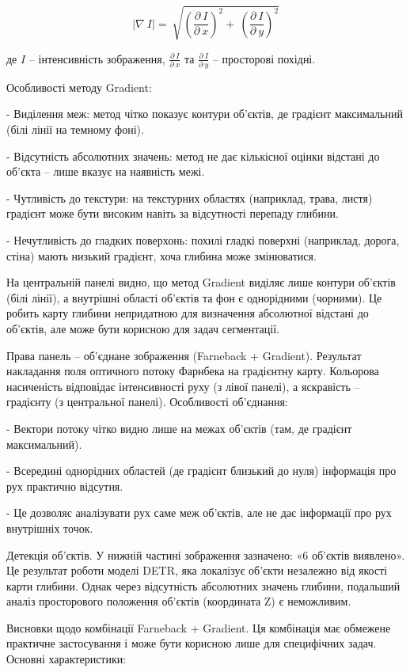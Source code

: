 \documentclass[
]{article}
\begin{document}
\[|\nabla\ I| = \ \sqrt{\left( \frac{\partial\ I}{\partial\ x} \right)^{2} + \ \left( \frac{\partial\ I}{\partial\ y} \right)^{2}}\]

де \(I\) -- інтенсивність зображення, \(\frac{\partial\ I}{\partial\ x}\) та \(\frac{\partial\ I}{\partial\ y}\) -- просторові похідні.

Особливості методу Gradient:

- Виділення меж: метод чітко показує контури об'єктів, де градієнт максимальний (білі лінії на темному фоні).

- Відсутність абсолютних значень: метод не дає кількісної оцінки відстані до об'єкта -- лише вказує на наявність межі.

- Чутливість до текстури: на текстурних областях (наприклад, трава, листя) градієнт може бути високим навіть за відсутності перепаду глибини.

- Нечутливість до гладких поверхонь: похилі гладкі поверхні (наприклад, дорога, стіна) мають низький градієнт, хоча глибина може змінюватися.

На центральній панелі видно, що метод Gradient виділяє лише контури об'єктів (білі лінії), а внутрішні області об'єктів та фон є однорідними (чорними). Це робить карту глибини непридатною для визначення абсолютної відстані до об'єктів, але може бути корисною для задач сегментації.

Права панель -- об'єднане зображення (Farneback + Gradient). Результат накладання поля оптичного потоку Фарнбека на градієнтну карту. Кольорова насиченість відповідає інтенсивності руху (з лівої панелі), а яскравість -- градієнту (з центральної панелі). Особливості об'єднання:

- Вектори потоку чітко видно лише на межах об'єктів (там, де градієнт максимальний).

- Всередині однорідних областей (де градієнт близький до нуля) інформація про рух практично відсутня.

- Це дозволяє аналізувати рух саме меж об'єктів, але не дає інформації про рух внутрішніх точок.

Детекція об'єктів. У нижній частині зображення зазначено: «6 об'єктів виявлено». Це результат роботи моделі DETR, яка локалізує об'єкти незалежно від якості карти глибини. Однак через відсутність абсолютних значень глибини, подальший аналіз просторового положення об'єктів (координата Z) є неможливим.

Висновки щодо комбінації Farneback + Gradient. Ця комбінація має обмежене практичне застосування і може бути корисною лише для специфічних задач. Основні характеристики:
\end{document}
